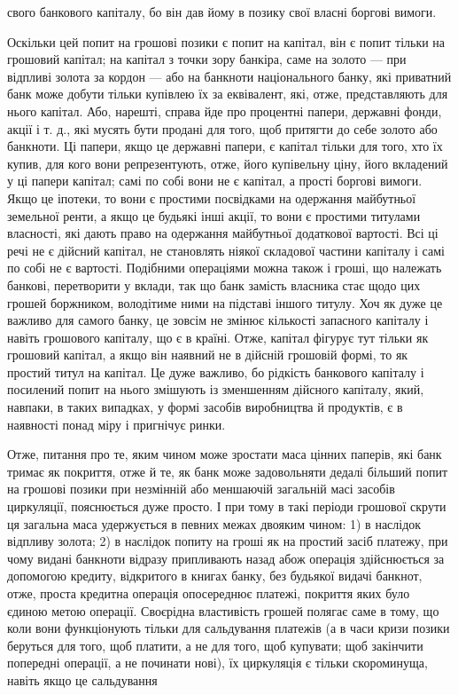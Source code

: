 свого банкового капіталу, бо він дав йому в позику свої власні
боргові вимоги.

Оскільки цей попит на грошові позики є попит на капітал,
він є попит тільки на грошовий капітал; на капітал з точки
зору банкіра, саме на золото — при відпливі золота за кордон —
або на банкноти національного банку, які приватний банк може
добути тільки купівлею їх за еквівалент, які, отже, представляють
для нього капітал. Або, нарешті, справа йде про процентні
папери, державні фонди, акції і т. д., які мусять бути
продані для того, щоб притягти до себе золото або банкноти.
Ці папери, якщо це державні папери, є капітал тільки для
того, хто їх купив, для кого вони репрезентують, отже, його
купівельну ціну, його вкладений у ці папери капітал; самі по
собі вони не є капітал, а прості боргові вимоги. Якщо це
іпотеки, то вони є простими посвідками на одержання майбутньої
земельної ренти, а якщо це будьякі інші акції, то вони
є простими титулами власності, які дають право на одержання
майбутньої додаткової вартості. Всі ці речі не є дійсний капітал,
не становлять ніякої складової частини капіталу і самі по собі
не є вартості. Подібними операціями можна також і гроші, що
належать банкові, перетворити у вклади, так що банк замість
власника стає щодо цих грошей боржником, володітиме ними
на підставі іншого титулу. Хоч як дуже це важливо для самого
банку, це зовсім не змінює кількості запасного капіталу і навіть
грошового капіталу, що є в країні. Отже, капітал фігурує тут
тільки як грошовий капітал, а якщо він наявний не в дійсній
грошовій формі, то як простий титул на капітал. Це дуже важливо,
бо рідкість банкового капіталу і посилений попит на нього
змішують із зменшенням дійсного капіталу, який, навпаки, в таких
випадках, у формі засобів виробництва й продуктів, є в наявності
понад міру і пригнічує ринки.

Отже, питання про те, яким чином може зростати маса цінних
паперів, які банк тримає як покриття, отже й те, як банк
може задовольняти дедалі більший попит на грошові позики при
незмінній або меншаючій загальній масі засобів циркуляції,
пояснюється дуже просто. І при тому в такі періоди грошової
скрути ця загальна маса удержується в певних межах двояким
чином: 1) в наслідок відпливу золота; 2) в наслідок попиту на
гроші як на простий засіб платежу, при чому видані банкноти
відразу припливають назад абож операція здійснюється за
допомогою кредиту, відкритого в книгах банку, без будьякої
видачі банкнот, отже, проста кредитна операція опосереднює
платежі, покриття яких було єдиною метою операції. Своєрідна
властивість грошей полягає саме в тому, що коли вони
функціонують тільки для сальдування платежів (а в часи кризи
позики беруться для того, щоб платити, а не для того, щоб
купувати; щоб закінчити попередні операції, а не починати нові), їх
циркуляція є тільки скороминуща, навіть якщо це сальдування
